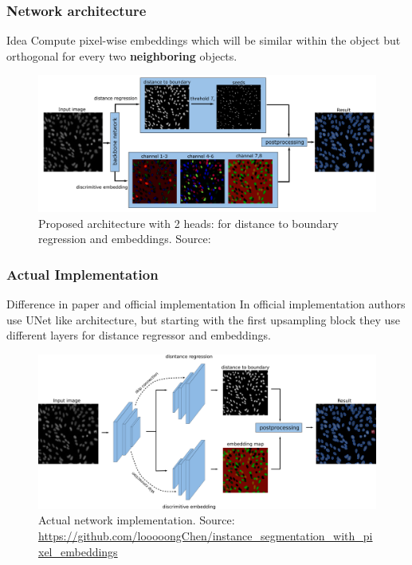 \documentclass{beamer}
\begin{document}
\begin{frame}
    \frametitle{Network architecture}

    \begin{block}{Idea}
        Compute pixel-wise embeddings which will be similar within the
        object but orthogonal for every two \textbf{neighboring} objects.
    \end{block}

    \begin{figure}[h]
        \includegraphics[height=0.49\textheight]{obj_aware_arch.png}
        \caption{Proposed architecture with 2 heads: for distance to boundary
            regression and embeddings. Source: \cite{chen2019instance}}
    \end{figure}

\end{frame}

\begin{frame}
    \frametitle{Actual Implementation}

    \begin{alertblock}{Difference in paper and official implementation}
        In official implementation authors use UNet like architecture, but starting with
        the first upsampling block they use different layers for distance regressor and
        embeddings.
    \end{alertblock}

    \begin{figure}[h]
        \includegraphics[height=0.43\textheight]{net_impl.png}
        \caption{Actual network implementation. Source: \url{https://github.com/looooongChen/instance_segmentation_with_pixel_embeddings}}
    \end{figure}

\end{frame}
\end{document}
